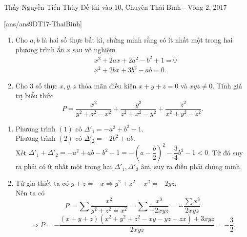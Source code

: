 \begin{name}
{Thầy  Nguyễn Tiến Thùy}
{Đề thi vào 10, Chuyên Thái Bình - Vòng 2, 2017}
\end{name}
\setcounter{ex}{0}
[ans/ans9DT17-ThaiBinh]
\begin{ex}%
    \hfill
    \begin{enumerate}
        \item Cho $a, b$ là hai số thực bất kì, chứng minh rằng có ít nhất một trong hai phương trình ẩn $x$ sau vô nghiệm
        \begin{align}
        &x^2+2ax+2a^2-b^2+1=0\\
        &x^2+2bx+3b^2-ab=0.
        \end{align}
        \item Cho 3 số thực $x, y, z$ thỏa mãn điều kiện $x+y+z=0$ và $xyz\ne 0$. Tính giá trị biểu thức $$P=\dfrac{x^2}{y^2+z^2-x^2}+\dfrac{y^2}{z^2+x^2-y^2}+\dfrac{z^2}{x^2+y^2-z^2}.$$
    \end{enumerate}
\loigiai
    {
    \begin{enumerate}
        \item Phương trình $(1)$ có $\Delta'_1=-a^2+b^2-1$.\\
        Phương trình $(2)$ có $\Delta'_2=-2b^2+ab$.\\ 
        Xét $\Delta'_1+\Delta'_2=-a^2+ab-b^2-1=-\left(a-\dfrac{b}{2}\right)^2-\dfrac{3}{4}b^2-1<0$. Từ đó suy ra phải có ít nhất một trong hai $\Delta'_1, \Delta'_2$ âm, suy ra điều phải chứng minh.
        \item Từ giả thiết ta có $y+z=-x\Rightarrow y^2+z^2-x^2=-2yz$. \\
        Nên ta có $$P=\sum\dfrac{x^2}{y^2+z^2=x^2}=\sum\dfrac{x^3}{-2xyz}=-\dfrac{\sum x^3}{2xyz}$$
        $$\Rightarrow P=-\dfrac{(x+y+z)(x^2+y^2+z^2-xy-yz-zx)+3xyz}{2xyz}=-\dfrac{3}{2}.$$
    \end{enumerate}
    }
\end{ex}

